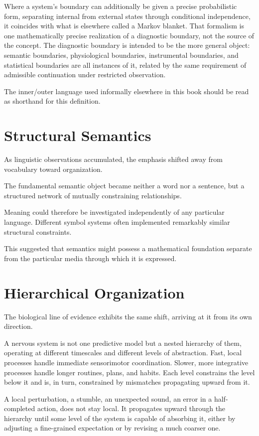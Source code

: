 \documentclass[11pt,oneside]{book}
\numberwithin{equation}{chapter}
\theoremstyle{definition}
\theoremstyle{plain}
\begin{document}
Where a system's boundary can additionally be given a precise probabilistic
form, separating internal from external states through conditional
independence, it coincides with what is elsewhere called a Markov blanket.
That formalism is one mathematically precise realization of a diagnostic
boundary, not the source of the concept. The diagnostic boundary is intended
to be the more general object: semantic boundaries, physiological
boundaries, instrumental boundaries, and statistical boundaries are all
instances of it, related by the same requirement of admissible continuation
under restricted observation.

The inner/outer language used informally elsewhere in this book should be
read as shorthand for this definition.

\section{Structural Semantics}

As linguistic observations accumulated, the emphasis shifted away from
vocabulary toward organization.

The fundamental semantic object became neither a word nor a sentence, but a
structured network of mutually constraining relationships.

Meaning could therefore be investigated independently of any particular
language. Different symbol systems often implemented remarkably similar
structural constraints.

This suggested that semantics might possess a mathematical foundation
separate from the particular media through which it is expressed.

\section{Hierarchical Organization}

The biological line of evidence exhibits the same shift, arriving at it from
its own direction.

A nervous system is not one predictive model but a nested hierarchy of them,
operating at different timescales and different levels of abstraction.
Fast, local processes handle immediate sensorimotor coordination. Slower,
more integrative processes handle longer routines, plans, and habits. Each
level constrains the level below it and is, in turn, constrained by
mismatches propagating upward from it.

A local perturbation, a stumble, an unexpected sound, an error in a
half-completed action, does not stay local. It propagates upward through the
hierarchy until some level of the system is capable of absorbing it, either
by adjusting a fine-grained expectation or by revising a much coarser one.
\end{document}
